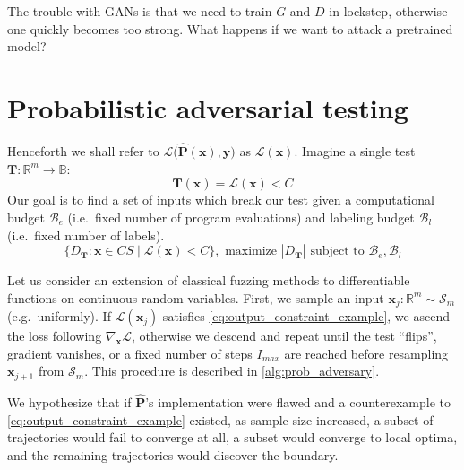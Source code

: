 The trouble with GANs is that we need to train $G$ and $D$ in lockstep, otherwise one quickly becomes too strong. What happens if we want to attack a pretrained model?
%
\section{Probabilistic adversarial testing}\label{sec:prob_ad_test}

\noindent Henceforth we shall refer to $\mathcal{L}\big(\mathbf{\hat P}(\mathbf{x}), \mathbf{y}\big)$ as $\mathcal{L}(\mathbf x)$. Imagine a single test $\mathbf{T}: \mathbb{R}^m \rightarrow \mathbb{B}$:
%
\begin{equation} \label{eq:output_constraint_example}
\mathbf T(\mathbf{x}) = \mathcal{L}(\mathbf{x}) < C
\end{equation}
%
Our goal is to find a set of inputs which break our test given a computational budget $\mathcal{B}_e$ (i.e.\ fixed number of program evaluations) and labeling budget $\mathcal{B}_l$ (i.e.\ fixed number of labels).
%
\begin{equation}
\{ D_\mathbf T: \mathbf x \in CS \mid \mathcal{L}(\mathbf{x}) < C\}, \text{ maximize } |D_\mathbf T| \text { subject to } \mathcal{B}_e, \mathcal{B}_l
\end{equation}
%

Let us consider an extension of classical fuzzing methods to differentiable functions on continuous random variables. First, we sample an input $\mathbf{x}_j: \mathbb{R}^m \sim \mathcal S_m$ (e.g.\ uniformly). If $\mathcal{L}(\mathbf{x}_j)$ satisfies \autoref{eq:output_constraint_example}, we ascend the loss following $\nabla_{\mathbf x}\mathcal{L}$, otherwise we descend and repeat until the test ``flips'', gradient vanishes, or a fixed number of steps $I_{max}$ are reached before resampling $\mathbf{x}_{j+1}$ from $\mathcal S_m$. This procedure is described in \autoref{alg:prob_adversary}.

We hypothesize that if $\mathbf{\hat P}$'s implementation were flawed and a counterexample to \autoref{eq:output_constraint_example} existed, as sample size increased, a subset of trajectories would fail to converge at all, a subset would converge to local optima, and the remaining trajectories would discover the boundary.

